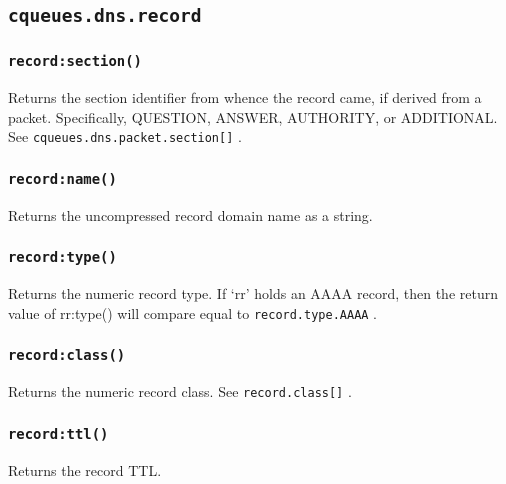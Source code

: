 \documentclass[11pt, oneside]{memoir}
\newcommand{\fn}[1]{\texttt{#1} }
\newcommand{\module}[1]{\texttt{#1} }
\newcounter{toccols}
\newenvironment{Module}[1]{
	\subsection{\texttt{#1}}
	\addtocontents{toc}{
		\protect\begin{multicols}{\value{toccols}}
	}
}{
	\addtocontents{toc}{\protect\end{multicols}}
}
\begin{document}
\begin{Module}{cqueues.dns.record}
\subsubsection[\fn{record:section}]{\fn{record:section()}}

Returns the section identifier from whence the record came, if derived from a packet. Specifically, QUESTION, ANSWER, AUTHORITY, or ADDITIONAL. See \module{cqueues.dns.packet.section[]}.

\subsubsection[\fn{record:name}]{\fn{record:name()}}

Returns the uncompressed record domain name as a string.

\subsubsection[\fn{record:type}]{\fn{record:type()}}

Returns the numeric record type. If `rr' holds an AAAA record, then the return value of rr:type() will compare equal to \module{record.type.AAAA}.

\subsubsection[\fn{record:class}]{\fn{record:class()}}

Returns the numeric record class. See \module{record.class[]}.

\subsubsection[\fn{record:ttl}]{\fn{record:ttl()}}

Returns the record TTL.

\end{Module}
\end{document}
